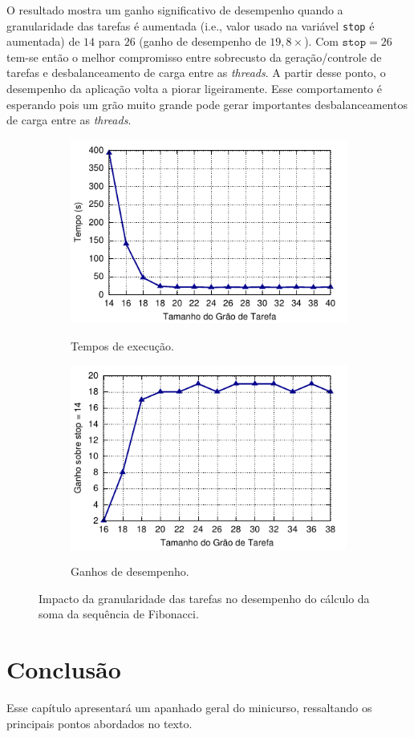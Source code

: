 \documentclass{SBCbookchapter}
\begin{document}
	O resultado mostra um ganho significativo de desempenho quando a
	granularidade das tarefas é aumentada (i.e., valor usado na variável
	\texttt{stop} é aumentada) de $14$ para $26$ (ganho de desempenho de
	$19,8\times$).  Com $\texttt{stop} = 26$ tem-se então o melhor
	compromisso entre sobrecusto da geração/controle de tarefas e
	desbalanceamento de carga entre as \textit{threads}. A partir desse
	ponto, o desempenho da aplicação volta a piorar ligeiramente. Esse
	comportamento é esperando pois um grão muito grande pode gerar
	importantes desbalanceamentos de carga entre as \textit{threads}.
	
		\begin{figure}[t]
			\captionsetup[subfigure]{justification=centering}
			\centering
				\begin{subfigure}{0.47\linewidth}
					\includegraphics[width=\linewidth]{img/fibonacci-task-grain}
					\label{fig:grao-tarefas-tempo}
					\caption{Tempos de execução.}
				\end{subfigure}
				\quad
				\begin{subfigure}{0.47\linewidth}
					\includegraphics[width=\linewidth]{img/fibonacci-speedup}
					\label{fig:grao-tarefas-ganho}
					\caption{Ganhos de desempenho.}
				\end{subfigure}
			\caption{Impacto da granularidade das tarefas no desempenho do cálculo da soma da sequência
				de Fibonacci.}
			\label{fig:grao-tarefas}
		\end{figure}


\section{Conclusão}
\label{sec:conclusao}

	Esse capítulo apresentará um apanhado geral do minicurso, ressaltando os
	principais pontos abordados no texto.


\end{document}
